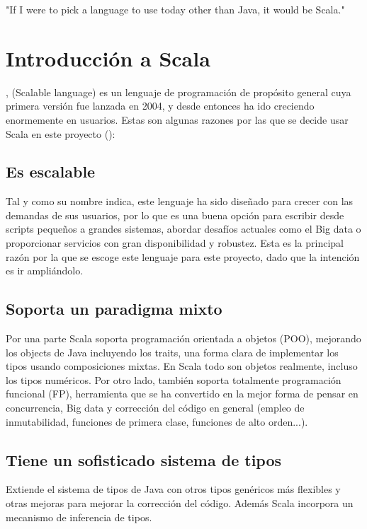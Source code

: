 
\begin{savequote}[75mm]
"If I were to pick a language to use today other than Java, it would be Scala."
\end{savequote}

\chapter{Introducción a Scala}
, (Scalable language) es un lenguaje de programación de propósito general cuya primera versión fue lanzada en 2004, y desde entonces ha ido creciendo enormemente en usuarios. Estas son algunas razones por las que se decide usar Scala en este proyecto (\citet{9781491949856}):
\section*{Es escalable} Tal y como su nombre indica, este lenguaje ha sido diseñado para crecer con las demandas de sus usuarios, por lo que es una buena opción para escribir desde scripts pequeños a grandes sistemas, abordar desafíos actuales como el Big data o proporcionar servicios con gran disponibilidad y robustez. Esta es la principal razón por la que se escoge este lenguaje para este proyecto, dado que la intención es ir ampliándolo.

\section*{Soporta un paradigma mixto} Por una parte \textsf{Scala} soporta programación orientada a objetos (POO), mejorando los objects de Java incluyendo los \textsf{traits}, una forma clara de implementar los tipos usando composiciones mixtas. En \textsf{Scala} todo son objetos realmente, incluso los tipos numéricos. Por otro lado, también soporta totalmente programación funcional (FP),
herramienta que se ha convertido en la mejor forma de pensar en concurrencia, Big data y corrección del código en general (empleo de inmutabilidad, funciones de primera clase, funciones de alto orden...). 

\section*{Tiene un sofisticado sistema de tipos} Extiende el sistema de tipos de Java con otros tipos genéricos más flexibles y otras mejoras para mejorar la corrección del código. Además \textsf{Scala} incorpora un mecanismo de inferencia de tipos.
